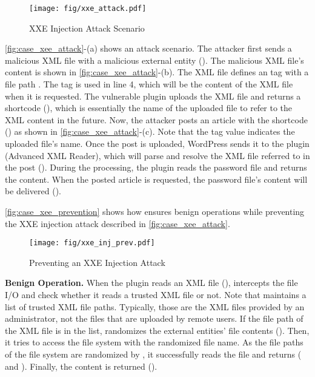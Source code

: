 \begin{figure}[ht]
    \centering
    \texttt{[image: fig/xxe\_attack.pdf]}
    \vspace{-1em}
     \caption{XXE Injection Attack Scenario}
     \vspace{-1em}
     \label{fig:case_xee_attack}
\end{figure}


\autoref{fig:case_xee_attack}-(a) shows an attack scenario. The attacker first sends a malicious XML file with a malicious external entity (). The malicious XML file's content is shown in \autoref{fig:case_xee_attack}-(b). The XML file defines an  tag with a file path . The tag is used in line 4, which will be the content of the XML file when it is requested. 
The vulnerable plugin uploads the XML file and returns a shortcode (), which is essentially the name of the uploaded file to refer to the XML content in the future.
Now, the attacker posts an article with the shortcode () as shown in \autoref{fig:case_xee_attack}-(c). Note that the tag value indicates the uploaded file's name. 
Once the post is uploaded, WordPress sends it to the plugin (Advanced XML Reader), which will parse and resolve the XML file referred to in the post (). During the processing, the plugin reads the password file and returns the content. When the posted article is requested, the password file's content will be delivered ().

\autoref{fig:case_xee_prevention} shows how \sysname ensures benign operations while preventing the XXE injection attack described in \autoref{fig:case_xee_attack}. 


\begin{figure}[ht]
    \centering
    \texttt{[image: fig/xxe\_inj\_prev.pdf]}
    \vspace{-2em}
     \caption{Preventing an XXE Injection Attack}
     \vspace{-1em}
     \label{fig:case_xee_prevention}

\end{figure}

\noindent
{\bf Benign Operation.}
When the plugin reads an XML file (), \sysname intercepts the file I/O and check whether it reads a trusted XML file or not. Note that \sysname maintains a list of trusted XML file paths. Typically, those are the XML files provided by an administrator, not the files that are uploaded by remote users.
If the file path of the XML file is in the list, \sysname randomizes the external entities' file contents (). Then, it tries to access the file system with the randomized file name. As the file paths of the file system are randomized by \sysname, it successfully reads the file and returns ( and ). Finally, the content is returned ().


